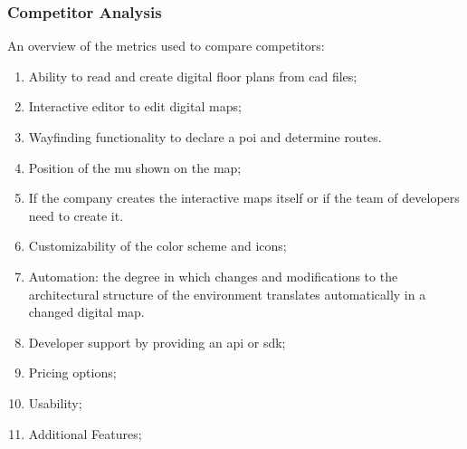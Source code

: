 \subsubsection{Competitor Analysis}
An overview of the metrics used to compare competitors:
\begin{enumerate}
\item Ability to read and create digital floor plans from \acrshort{cad} files;
\item Interactive editor to edit digital maps;
\item Wayfinding functionality to declare a \acrlong{poi} and determine routes.
\item Position of the \acrlong{mu} shown on the map;
\item If the company creates the interactive maps itself or if the team of developers need to create it.
\item Customizability of the color scheme and icons;
\item Automation: the degree in which changes and modifications to the architectural structure of the environment translates automatically in a changed digital map.
\item Developer support by providing an \acrshort{api} or \acrshort{sdk};
\item Pricing options;
\item Usability;
\item Additional Features;
\end{enumerate}

